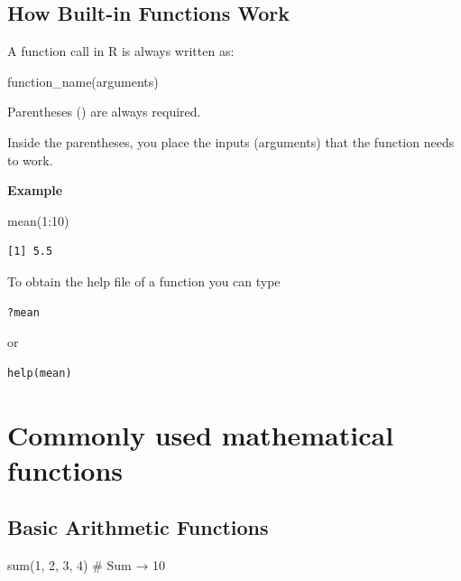 \documentclass[
  letterpaper,
  DIV=11,
  numbers=noendperiod]{scrreprt}
\newenvironment{Shaded}{\begin{snugshade}}{\end{snugshade}}
\newcommand{\CommentTok}[1]{\textcolor[rgb]{0.37,0.37,0.37}{#1}}
\newcommand{\DecValTok}[1]{\textcolor[rgb]{0.68,0.00,0.00}{#1}}
\newcommand{\FunctionTok}[1]{\textcolor[rgb]{0.28,0.35,0.67}{#1}}
\newcommand{\NormalTok}[1]{\textcolor[rgb]{0.00,0.23,0.31}{#1}}
\newcommand{\SpecialCharTok}[1]{\textcolor[rgb]{0.37,0.37,0.37}{#1}}
\begin{document}
\subsection{How Built-in Functions
Work}\label{how-built-in-functions-work}

A function call in R is always written as:

\begin{Shaded}
\begin{Highlighting}[]
\FunctionTok{function\_name}\NormalTok{(arguments)}
\end{Highlighting}
\end{Shaded}

Parentheses () are always required.

Inside the parentheses, you place the inputs (arguments) that the
function needs to work.

\textbf{Example}

\begin{Shaded}
\begin{Highlighting}[]
\FunctionTok{mean}\NormalTok{(}\DecValTok{1}\SpecialCharTok{:}\DecValTok{10}\NormalTok{)}
\end{Highlighting}
\end{Shaded}

\begin{verbatim}
[1] 5.5
\end{verbatim}

To obtain the help file of a function you can type

\begin{verbatim}
?mean
\end{verbatim}

or

\begin{verbatim}
help(mean)
\end{verbatim}

\section{Commonly used mathematical
functions}\label{commonly-used-mathematical-functions}

\subsection{Basic Arithmetic
Functions}\label{basic-arithmetic-functions}

\begin{Shaded}
\begin{Highlighting}[]
\FunctionTok{sum}\NormalTok{(}\DecValTok{1}\NormalTok{, }\DecValTok{2}\NormalTok{, }\DecValTok{3}\NormalTok{, }\DecValTok{4}\NormalTok{)        }\CommentTok{\# Sum → 10}
\end{Highlighting}
\end{Shaded}
\end{document}
